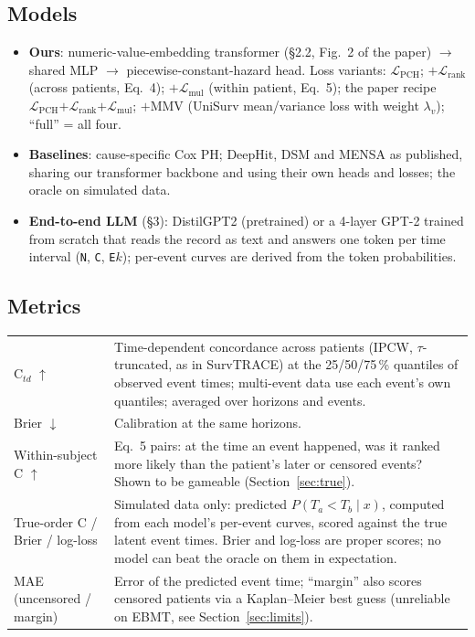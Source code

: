 \documentclass[11pt,a4paper]{article}
\newcommand{\Lpch}{$\mathcal{L}_{\mathrm{PCH}}$}
\newcommand{\Lrank}{$\mathcal{L}_{\mathrm{rank}}$}
\newcommand{\Lmul}{$\mathcal{L}_{\mathrm{mul}}$}
\newcommand{\Ctd}{C$_{td}$}
\begin{document}
\subsection{Models}
\begin{itemize}
  \item \textbf{Ours}: numeric-value-embedding transformer (\S2.2, Fig.~2 of the paper) $\to$ shared MLP $\to$
        piecewise-constant-hazard head. Loss variants: \Lpch{}; $+$\Lrank{} (across patients, Eq.~4); $+$\Lmul{} (within
        patient, Eq.~5); the paper recipe \Lpch{}$+$\Lrank{}$+$\Lmul{}; $+$MMV (UniSurv mean/variance loss with weight
        $\lambda_v$); ``full'' = all four.
  \item \textbf{Baselines}: cause-specific Cox PH; DeepHit, DSM and MENSA as published, sharing our transformer backbone
        and using their own heads and losses; the oracle on simulated data.
  \item \textbf{End-to-end LLM} (\S3): DistilGPT2 (pretrained) or a 4-layer GPT-2 trained from scratch that reads
        the record as text and answers one token per time interval (\texttt{N}, \texttt{C}, \texttt{E}$k$);
        per-event curves are derived from the token probabilities.
\end{itemize}

\subsection{Metrics}
\begin{table}[H]\centering\small
\begin{tabular}{p{3.6cm}p{11.4cm}}
\toprule
\Ctd{} $\uparrow$ & Time-dependent concordance across patients (IPCW, $\tau$-truncated, as in SurvTRACE) at the
                     25/50/75\,\% quantiles of observed event times; multi-event data use each event's own
                     quantiles; averaged over horizons and events. \\
Brier $\downarrow$ & Calibration at the same horizons. \\
Within-subject C $\uparrow$ & Eq.~5 pairs: at the time an event happened, was it ranked more likely than the
                     patient's later or censored events? Shown to be gameable (Section~\ref{sec:true}). \\
True-order C / Brier / log-loss & Simulated data only: predicted $P(T_a<T_b\mid x)$, computed from each model's
                     per-event curves, scored against the true latent event times. Brier and log-loss are proper
                     scores; no model can beat the oracle on them in expectation. \\
MAE (uncensored / margin) & Error of the predicted event time; ``margin'' also scores censored patients via a
                     Kaplan--Meier best guess (unreliable on EBMT, see Section~\ref{sec:limits}). \\
\bottomrule
\end{tabular}
\end{table}
\end{document}
